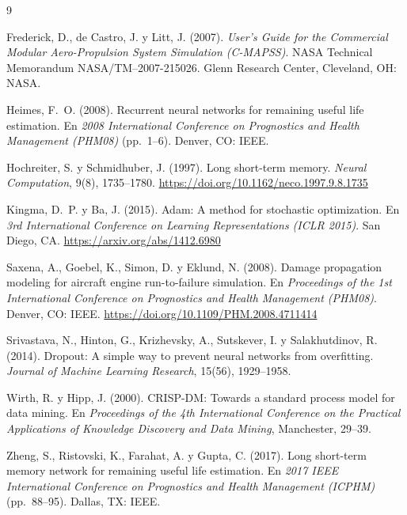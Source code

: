 \documentclass[letterpaper]{article}
\begin{document}
\begin{thebibliography}{9}

Frederick, D., de Castro, J. y Litt, J. (2007).
\textit{User's Guide for the Commercial Modular Aero-Propulsion System
Simulation (C-MAPSS)}.
NASA Technical Memorandum NASA/TM--2007-215026. Glenn Research Center,
Cleveland, OH: NASA.

Heimes, F.~O. (2008).
Recurrent neural networks for remaining useful life estimation.
En \textit{2008 International Conference on Prognostics and Health
Management (PHM08)} (pp.~1--6). Denver, CO: IEEE.

Hochreiter, S. y Schmidhuber, J. (1997).
Long short-term memory.
\textit{Neural Computation}, 9(8), 1735--1780.
\url{https://doi.org/10.1162/neco.1997.9.8.1735}

Kingma, D.~P. y Ba, J. (2015).
Adam: A method for stochastic optimization.
En \textit{3rd International Conference on Learning Representations
(ICLR 2015)}. San Diego, CA.
\url{https://arxiv.org/abs/1412.6980}

Saxena, A., Goebel, K., Simon, D. y Eklund, N. (2008).
Damage propagation modeling for aircraft engine run-to-failure simulation.
En \textit{Proceedings of the 1st International Conference on Prognostics
and Health Management (PHM08)}. Denver, CO: IEEE.
\url{https://doi.org/10.1109/PHM.2008.4711414}

Srivastava, N., Hinton, G., Krizhevsky, A., Sutskever, I. y
Salakhutdinov, R. (2014).
Dropout: A simple way to prevent neural networks from overfitting.
\textit{Journal of Machine Learning Research}, 15(56), 1929--1958.

Wirth, R. y Hipp, J. (2000).
CRISP-DM: Towards a standard process model for data mining.
En \textit{Proceedings of the 4th International Conference on the
Practical Applications of Knowledge Discovery and Data Mining},
Manchester, 29--39.

Zheng, S., Ristovski, K., Farahat, A. y Gupta, C. (2017).
Long short-term memory network for remaining useful life estimation.
En \textit{2017 IEEE International Conference on Prognostics and Health
Management (ICPHM)} (pp.~88--95). Dallas, TX: IEEE.

\end{thebibliography}
\end{document}
